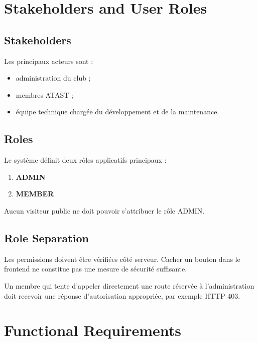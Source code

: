 \documentclass[11pt,a4paper]{report}
\begin{document}
\chapter{Stakeholders and User Roles}

\section{Stakeholders}

Les principaux acteurs sont :

\begin{itemize}
    \item administration du club ;
    \item membres ATAST ;
    \item équipe technique chargée du développement et de la maintenance.
\end{itemize}

\section{Roles}

Le système définit deux rôles applicatifs principaux :

\begin{enumerate}
    \item \textbf{ADMIN}
    \item \textbf{MEMBER}
\end{enumerate}

Aucun visiteur public ne doit pouvoir s'attribuer le rôle ADMIN.

\section{Role Separation}

Les permissions doivent être vérifiées côté serveur. Cacher un bouton dans le frontend ne constitue pas une mesure de sécurité suffisante.

Un membre qui tente d'appeler directement une route réservée à l'administration doit recevoir une réponse d'autorisation appropriée, par exemple HTTP 403.

\chapter{Functional Requirements}
\end{document}
